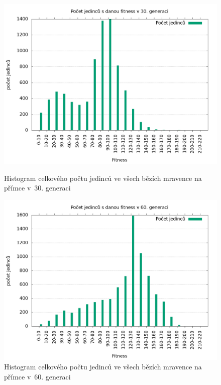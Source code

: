 \begin{figure}[h]
    \begin{minipage}[c]{0.48\linewidth}
        \includegraphics[width=\linewidth]{obrazky/mravenec_primka_fitnessHistogram30.png}
        \caption{Histogram celkového počtu jedinců ve všech bězích mravence na přímce v~30. generaci}
        \label{fig:mravenec_primka_histogram_30}
    \end{minipage}
    \hfill
    \begin{minipage}[c]{0.48\linewidth}
        \includegraphics[width=\linewidth]{obrazky/mravenec_primka_fitnessHistogram60.png}
        \caption{Histogram celkového počtu jedinců ve všech bězích mravence na přímce v~60. generaci}
        \label{fig:mravenec_primka_histogram_60}
    \end{minipage}
\end{figure}


